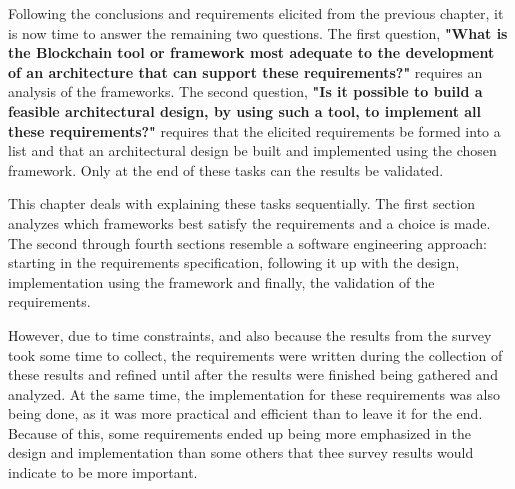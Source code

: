 

Following the conclusions and requirements elicited from the previous chapter, it is now time to answer the remaining two questions. The first question, \textbf{"What is the Blockchain tool or framework most adequate to the development of an architecture that can support these requirements?"} requires an analysis of the frameworks. The second question, \textbf{"Is it possible to build a feasible architectural design, by using such a tool, to implement all these requirements?"} requires that the elicited requirements be formed into a list and that an architectural design be built and implemented using the chosen framework. Only at the end of these tasks can the results be validated. 

This chapter deals with explaining these tasks sequentially. The first section analyzes which frameworks best satisfy the requirements and a choice is made. The second through fourth sections resemble a software engineering approach: starting in the requirements specification, following it up with the design, implementation using the framework and finally, the validation of the requirements.

However, due to time constraints, and also because the results from the survey took some time to collect, the requirements were written during the collection of these results and refined until after the results were finished being gathered and analyzed. At the same time, the implementation for these requirements was also being done, as it was more practical and efficient than to leave it for the end. Because of this, some requirements ended up being more emphasized in the design and implementation than some others that thee survey results would indicate to be more important.
